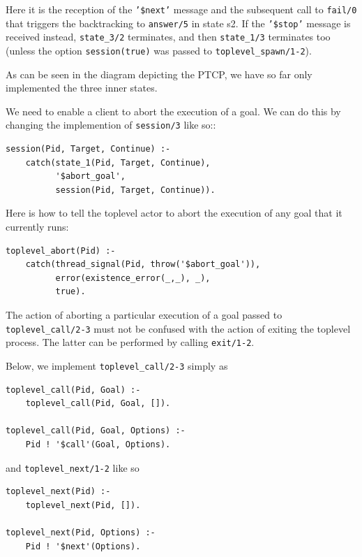 \noindent Here it is the reception of the \texttt{'\$next'} message and the subsequent call to \texttt{fail/0} that triggers the backtracking to \texttt{answer/5} in state s2. If the \texttt{'\$stop'} message is received instead, \texttt{state\_3/2} terminates, and then \texttt{state\_1/3} terminates too (unless the option \texttt{session(true)} was passed to \texttt{toplevel\_spawn/1-2}).

As can be seen in the diagram depicting the PTCP, we have so far only implemented the three inner states. 

We need to enable a client to abort the execution of a goal. We can do this by changing the implemention of \texttt{session/3} like so::

\begin{verbatim}    
session(Pid, Target, Continue) :-
    catch(state_1(Pid, Target, Continue), 
          '$abort_goal',
          session(Pid, Target, Continue)).
\end{verbatim}

\noindent Here is how to tell the toplevel actor to abort the execution of any goal that it currently runs:

\begin{verbatim}
toplevel_abort(Pid) :-
    catch(thread_signal(Pid, throw('$abort_goal')), 
          error(existence_error(_,_), _), 
          true).  
\end{verbatim}

\noindent The action of aborting a particular execution of a goal passed to \texttt{toplevel\_call/2-3} must not be confused with the action of exiting the toplevel process. The latter can be performed by calling \texttt{exit/1-2}.

Below, we implement \texttt{toplevel\_call/2-3} simply as

\begin{verbatim}
toplevel_call(Pid, Goal) :-
    toplevel_call(Pid, Goal, []).

toplevel_call(Pid, Goal, Options) :-
    Pid ! '$call'(Goal, Options).
\end{verbatim}

\noindent and \texttt{toplevel\_next/1-2} like so

\begin{verbatim}
toplevel_next(Pid) :-
    toplevel_next(Pid, []).

toplevel_next(Pid, Options) :-
    Pid ! '$next'(Options). 
\end{verbatim}    

